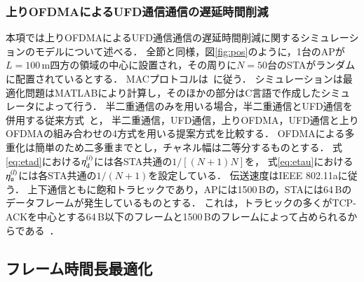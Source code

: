 \documentclass[master]{kuisthesis}		%
\begin{document}
		\subsubsection{上りOFDMAによるUFD通信通信の遅延時間削減}
			本項では上りOFDMAによるUFD通信通信の遅延時間削減に関するシミュレーションのモデルについて述べる．
			全節と同様，図\ref{fig:pos}のように，1台のAPが$L=100$\,m四方の領域の中心に設置され，その周りに$N=50$台のSTAがランダムに配置されているとする．
			MACプロトコルは~\cite{promac}に従う．
			シミュレーションは最適化問題はMATLABにより計算し，そのほかの部分はC言語で作成したシミュレータによって行う．
			半二重通信のみを用いる場合，半二重通信とUFD通信を併用する従来方式~\cite{promac_fair}と，
			半二重通信，UFD通信，上りOFDMA，UFD通信と上りOFDMAの組み合わせの4方式を用いる提案方式を比較する．
			OFDMAによる多重化は簡単のため二多重までとし，チャネル幅は二等分するものとする．
			式\eqref{eq:etad}における$\eta_{\rm d}^{(i)}$には各STA共通の$1/[(N+1)N]$を，
			式\eqref{eq:etau}における$\eta_{\rm u}^{(l)}$には各STA共通の$1/(N+1)$を設定している．
			伝送速度はIEEE 802.11aに従う．
			上下通信ともに飽和トラヒックであり，APには1500\,Bの，STAには64\,Bのデータフレームが発生しているものとする．
			これは，トラヒックの多くがTCP-ACKを中心とする64\,B以下のフレームと1500\,Bのフレームによって占められるからである~\cite{traffic}．
	\subsection{フレーム時間長最適化}
\end{document}
